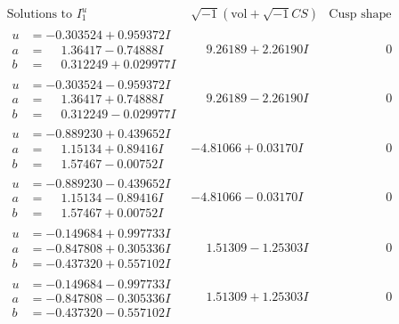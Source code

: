 \documentclass[1p]{elsarticle_modified}
\theoremstyle{definition}
\newcommand{\I}{\sqrt{-1}}
\begin{document}
$$\begin{array}{c|c|c}  
\text{Solutions to }I^u_{1}& \I (\text{vol} + \sqrt{-1}CS) & \text{Cusp shape}\\
 \hline 
\begin{aligned}
u &= -0.303524 + 0.959372 I \\
a &= \phantom{-}1.36417 - 0.74888 I \\
b &= \phantom{-}0.312249 + 0.029977 I\end{aligned}
 & \phantom{-}9.26189 + 2.26190 I & \phantom{-0.000000 } 0 \\ \hline\begin{aligned}
u &= -0.303524 - 0.959372 I \\
a &= \phantom{-}1.36417 + 0.74888 I \\
b &= \phantom{-}0.312249 - 0.029977 I\end{aligned}
 & \phantom{-}9.26189 - 2.26190 I & \phantom{-0.000000 } 0 \\ \hline\begin{aligned}
u &= -0.889230 + 0.439652 I \\
a &= \phantom{-}1.15134 + 0.89416 I \\
b &= \phantom{-}1.57467 - 0.00752 I\end{aligned}
 & -4.81066 + 0.03170 I & \phantom{-0.000000 } 0 \\ \hline\begin{aligned}
u &= -0.889230 - 0.439652 I \\
a &= \phantom{-}1.15134 - 0.89416 I \\
b &= \phantom{-}1.57467 + 0.00752 I\end{aligned}
 & -4.81066 - 0.03170 I & \phantom{-0.000000 } 0 \\ \hline\begin{aligned}
u &= -0.149684 + 0.997733 I \\
a &= -0.847808 + 0.305336 I \\
b &= -0.437320 + 0.557102 I\end{aligned}
 & \phantom{-}1.51309 - 1.25303 I & \phantom{-0.000000 } 0 \\ \hline\begin{aligned}
u &= -0.149684 - 0.997733 I \\
a &= -0.847808 - 0.305336 I \\
b &= -0.437320 - 0.557102 I\end{aligned}
 & \phantom{-}1.51309 + 1.25303 I & \phantom{-0.000000 } 0 \\ \hline\begin{aligned}

\end{aligned}
\end{array}$$
\end{document}

